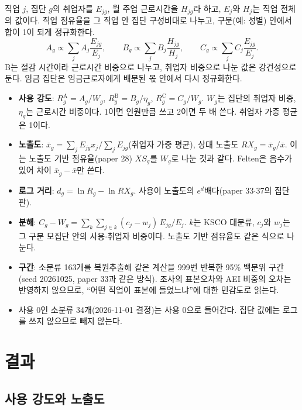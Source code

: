 \documentclass[11pt]{article}
\begin{document}
직업 $j$, 집단 $g$의 취업자를 $E_{jg}$, 월 주업 근로시간을 $H_{jg}$라 하고, $E_j$와 $H_j$는 직업 전체의 값이다. 직업 점유율을 그 직업 안 집단 구성비대로 나누고, 구분(예: 성별) 안에서 합이 1이 되게 정규화한다.
\[
A_g \propto \sum_j A_j \frac{E_{jg}}{E_j}, \qquad
B_g \propto \sum_j B_j \frac{H_{jg}}{H_j}, \qquad
C_g \propto \sum_j C_j \frac{E_{jg}}{E_j}.
\]
B는 절감 시간이라 근로시간 비중으로 나누고, 취업자 비중으로 나눈 값은 강건성으로 둔다. 임금 집단은 임금근로자에게 배분된 몫 안에서 다시 정규화한다.
\begin{itemize}[leftmargin=*]
  \item \textbf{사용 강도}: $R^{\mathrm{A}}_g = A_g / W_g$, $R^{\mathrm{B}}_g = B_g / \eta_g$, $R^{\mathrm{C}}_g = C_g / W_g$. $W_g$는 집단의 취업자 비중, $\eta_g$는 근로시간 비중이다. 1이면 인원만큼 쓰고 2이면 두 배 쓴다. 취업자 가중 평균은 1이다.
  \item \textbf{노출도}: $\bar x_g = \sum_j E_{jg} x_j / \sum_j E_{jg}$(취업자 가중 평균), 상대 노출도 $RX_g = \bar x_g / \bar x$. 이는 노출도 기반 점유율(paper 28) $XS_g$를 $W_g$로 나눈 것과 같다. Felten은 음수가 있어 차이 $\bar x_g - \bar x$만 쓴다.
  \item \textbf{로그 거리}: $d_g = \ln R_g - \ln RX_g$. 사용이 노출도의 $e^{d}$배다(paper 33$\cdot$37의 집단판).
  \item \textbf{분해}: $C_g - W_g = \sum_k \sum_{j \in k} (c_j - w_j)\, E_{jg}/E_j$. $k$는 KSCO 대분류, $c_j$와 $w_j$는 그 구분 모집단 안의 사용$\cdot$취업자 비중이다. 노출도 기반 점유율도 같은 식으로 나눈다.
  \item \textbf{구간}: 소분류 163개를 복원추출해 같은 계산을 999번 반복한 95\% 백분위 구간(seed 20261025, paper 33과 같은 방식). 조사의 표본오차와 AEI 비중의 오차는 반영하지 않으므로, ``어떤 직업이 표본에 들었느냐''에 대한 민감도로 읽는다.
  \item 사용 0인 소분류 34개(2026-11-01 결정)는 사용 0으로 들어간다. 집단 값에는 로그를 쓰지 않으므로 빼지 않는다.
\end{itemize}

\section{결과}

\subsection{사용 강도와 노출도}
\end{document}
